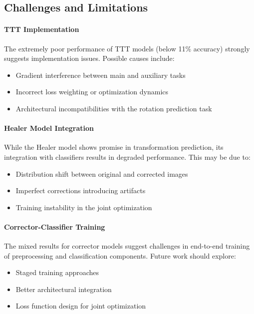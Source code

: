 \documentclass[11pt,a4paper]{article}
\begin{document}
\subsection{Challenges and Limitations}

\paragraph{TTT Implementation}
The extremely poor performance of TTT models (below 11\% accuracy) strongly suggests implementation issues. Possible causes include:
\begin{itemize}
    \item Gradient interference between main and auxiliary tasks
    \item Incorrect loss weighting or optimization dynamics
    \item Architectural incompatibilities with the rotation prediction task
\end{itemize}

\paragraph{Healer Model Integration}
While the Healer model shows promise in transformation prediction, its integration with classifiers results in degraded performance. This may be due to:
\begin{itemize}
    \item Distribution shift between original and corrected images
    \item Imperfect corrections introducing artifacts
    \item Training instability in the joint optimization
\end{itemize}

\paragraph{Corrector-Classifier Training}
The mixed results for corrector models suggest challenges in end-to-end training of preprocessing and classification components. Future work should explore:
\begin{itemize}
    \item Staged training approaches
    \item Better architectural integration
    \item Loss function design for joint optimization
\end{itemize}
\end{document}
